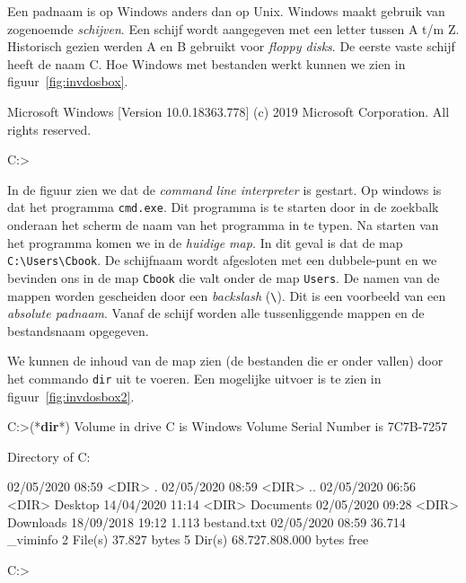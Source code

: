 Een padnaam is op Windows anders dan op Unix. Windows maakt gebruik van zogenoemde \textsl{schijven}. Een schijf wordt aangegeven met een letter tussen A t/m Z. Historisch gezien werden A en B gebruikt voor \textsl{floppy disks}. De eerste vaste schijf heeft de naam C. Hoe Windows met bestanden werkt kunnen we zien in figuur~\ref{fig:invdosbox}.

\begin{dosbox}[title=Starten van een DOS-box.,label=fig:invdosbox]
Microsoft Windows [Version 10.0.18363.778]
(c) 2019 Microsoft Corporation. All rights reserved.

C:\Users\Cbook>
\end{dosbox}

In de figuur zien we dat de \textsl{command line interpreter} is gestart. Op windows is dat het programma \texttt{cmd.exe}. Dit programma is te starten door in de zoekbalk onderaan het scherm de naam van het programma in te typen. Na starten van het programma komen we in de \textsl{huidige map.} In dit geval is dat de map \texttt{C:\textbackslash Users\textbackslash Cbook}. De schijfnaam wordt afgesloten met een dubbele-punt en we bevinden ons in de map \texttt{Cbook} die valt onder de map \texttt{Users}. De namen van de mappen worden gescheiden door een \textsl{backslash} (\texttt{\textbackslash}). Dit is een voorbeeld van een \textsl{absolute padnaam}. Vanaf de schijf worden alle tussenliggende mappen en de bestandsnaam opgegeven.

We kunnen de inhoud van de map zien (de bestanden die er onder vallen) door het commando \texttt{dir} uit te voeren. Een mogelijke uitvoer is te zien in figuur~\ref{fig:invdosbox2}.

\begin{dosbox}[title=Uitvoer van het \texttt{dir}-commando.,label=fig:invdosbox2]
C:\Users\Cbook>(*\textbf{dir}*)
 Volume in drive C is Windows
 Volume Serial Number is 7C7B-7257

 Directory of C:\Users\Cbook

02/05/2020  08:59    <DIR>          .
02/05/2020  08:59    <DIR>          ..
02/05/2020  06:56    <DIR>          Desktop
14/04/2020  11:14    <DIR>          Documents
02/05/2020  09:28    <DIR>          Downloads
18/09/2018  19:12             1.113 bestand.txt
02/05/2020  08:59            36.714 _viminfo
              2 File(s)          37.827 bytes
              5 Dir(s)   68.727.808.000 bytes free

C:\Users\Cbook>
\end{dosbox}

